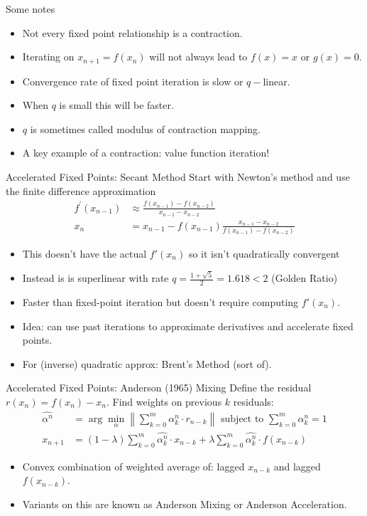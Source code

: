 \documentclass[aspectratio=169,11pt]{beamer}
\begin{document}
\begin{frame}{Some notes}
\begin{itemize}
\item Not every fixed point relationship is a contraction.
\item Iterating on $x_{n+1} = f(x_n)$ will not always lead to $f(x) = x$ or $g(x) =0$.
\item Convergence rate of fixed point iteration is \alert{slow} or $q-$linear.
\item When $q$ is small this will be faster.
\item $q$ is sometimes called \alert{modulus} of contraction mapping.
\item A key example of a contraction: \alert{value function iteration}!
\end{itemize}
\end{frame}

\begin{frame}{Accelerated Fixed Points: Secant Method}
Start with Newton's method and use the finite difference approximation
\begin{align*}
f^{\prime}\left(x_{n-1}\right)  &\approx \frac{f\left(x_{n-1}\right)-f\left(x_{n-2}\right)}{x_{n-1}-x_{n-2}} \\
x_{n}&=x_{n-1}-f\left(x_{n-1}\right) \frac{x_{n-1}-x_{n-2}}{f\left(x_{n-1}\right)-f\left(x_{n-2}\right)}
\end{align*}
\begin{itemize}
\item This doesn't have the actual $f'(x_n)$ so it isn't quadratically convergent
\item Instead is is superlinear with rate $q = \frac{1 + \sqrt{5}}{2}=1.618 < 2$ (Golden Ratio)
\item Faster than fixed-point iteration but doesn't require computing $f'(x_n)$.
\item Idea: can use past iterations to approximate derivatives and accelerate fixed points.
\item For (inverse) quadratic approx: \alert{Brent's Method} (sort of).
\end{itemize}
\end{frame}

\begin{frame}{Accelerated Fixed Points: Anderson (1965) Mixing}
Define the residual $r(x_n) = f(x_n) - x_n$. Find weights on previous $k$ residuals:
\begin{align*}
\widehat{\alpha^{n}} &= \arg \min_{\alpha} \left\|\sum_{k=0}^{m} \alpha_{k}^{n} \cdot r_{n-k}\right\| \text { subject to } \sum_{k=0}^{m} \alpha_{k}^{n}=1\\
x_{n+1}&=\left(1-\lambda\right) \sum_{k=0}^{m} \widehat{\alpha_{k}^{n}}\cdot x_{n-k}+\lambda \sum_{k=0}^{m}\widehat{\alpha_{k}^{n}}\cdot f\left(x_{n-k}\right)
\end{align*}
\begin{itemize}
\item Convex combination of weighted average of: lagged $x_{n-k}$ and lagged $f(x_{n-k})$.
\item Variants on this are known as \alert{Anderson Mixing} or \alert{Anderson Acceleration}.
\end{itemize}
\end{frame}
\end{document}
